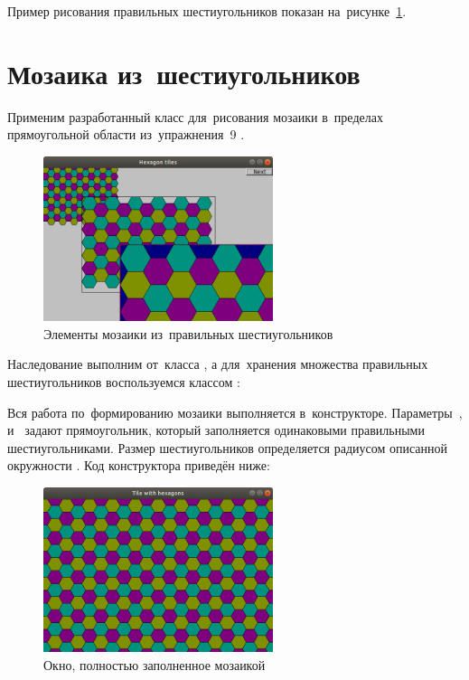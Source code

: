 Пример рисования правильных шестиугольников показан на~рисунке~\ref{fig:regularhexagon}.



\section{Мозаика из~шестиугольников}
Применим разработанный класс  для~рисования мозаики в~пределах прямоугольной области из~упражнения~9 .

\begin{figure}[ht]
  {\centering
    \includegraphics[width=0.6\textwidth]{images/hexagon_tiles.png}

  }
  \caption{Элементы мозаики из~правильных шестиугольников}
  \label{fig:regularhexagon}
\end{figure}

Наследование выполним от~класса , а для~хранения множества правильных шестиугольников воспользуемся классом :


Вся работа по~формированию мозаики выполняется в~конструкторе. Параметры~,  и~ задают прямоугольник, который заполняется одинаковыми правильными шестиугольниками. Размер шестиугольников определяется радиусом описанной окружности . Код конструктора приведён ниже:


\begin{figure}[ht]
  {\centering
    \includegraphics[width=0.6\textwidth]{images/tile_window.png}

  }
  \caption{Окно, полностью заполненное мозаикой}
  \label{fig:hexagontile}
\end{figure}

